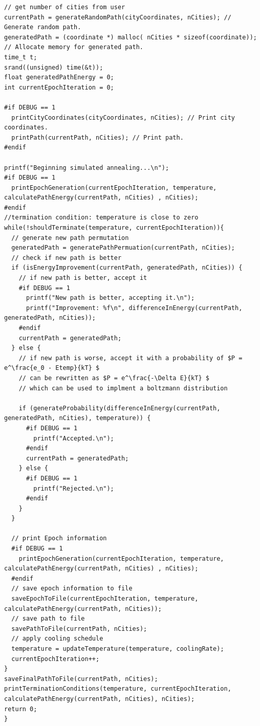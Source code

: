 \documentclass[a4paper,10pt]{article}
\begin{document}
\begin{lstlisting}[style = code, title = main.c]
// get number of cities from user
currentPath = generateRandomPath(cityCoordinates, nCities); // Generate random path.
generatedPath = (coordinate *) malloc( nCities * sizeof(coordinate)); // Allocate memory for generated path.
time_t t;
srand((unsigned) time(&t));
float generatedPathEnergy = 0;
int currentEpochIteration = 0;

#if DEBUG == 1
  printCityCoordinates(cityCoordinates, nCities); // Print city coordinates.  
  printPath(currentPath, nCities); // Print path.
#endif

printf("Beginning simulated annealing...\n");
#if DEBUG == 1
  printEpochGeneration(currentEpochIteration, temperature, calculatePathEnergy(currentPath, nCities) , nCities);
#endif
//termination condition: temperature is close to zero
while(!shouldTerminate(temperature, currentEpochIteration)){
  // generate new path permutation
  generatedPath = generatePathPermuation(currentPath, nCities);
  // check if new path is better
  if (isEnergyImprovement(currentPath, generatedPath, nCities)) {
    // if new path is better, accept it
    #if DEBUG == 1
      printf("New path is better, accepting it.\n");
      printf("Improvement: %f\n", differenceInEnergy(currentPath, generatedPath, nCities));
    #endif
    currentPath = generatedPath;
  } else {
    // if new path is worse, accept it with a probability of $P = e^\frac{e_0 - Etemp}{kT} $
    // can be rewritten as $P = e^\frac{-\Delta E}{kT} $
    // which can be used to implment a boltzmann distribution

    if (generateProbability(differenceInEnergy(currentPath, generatedPath, nCities), temperature)) {
      #if DEBUG == 1
        printf("Accepted.\n");
      #endif
      currentPath = generatedPath;
    } else {
      #if DEBUG == 1
        printf("Rejected.\n");
      #endif
    }
  }

  // print Epoch information 
  #if DEBUG == 1
    printEpochGeneration(currentEpochIteration, temperature, calculatePathEnergy(currentPath, nCities) , nCities);
  #endif
  // save epoch information to file
  saveEpochToFile(currentEpochIteration, temperature, calculatePathEnergy(currentPath, nCities));
  // save path to file
  savePathToFile(currentPath, nCities);
  // apply cooling schedule
  temperature = updateTemperature(temperature, coolingRate);
  currentEpochIteration++;
}
saveFinalPathToFile(currentPath, nCities);
printTerminationConditions(temperature, currentEpochIteration, calculatePathEnergy(currentPath, nCities), nCities);
return 0;
}

\end{lstlisting}
\end{document}
